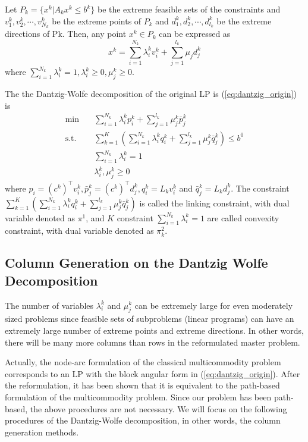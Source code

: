 Let $P_k=\{x^k|A_k x^k\leq b^k\}$ be the extreme feasible sets of the constraints and $v_1^k,v_2^k,\cdots,v_{N_k}^k$ be the extreme points of $P_k$ and $d_1^k,d_2^k,\cdots,d_{l_k}^k$ be the extreme directions of Pk. Then, any point $x^k\in P_k$ can be expressed as
\begin{equation}
    x^k=\sum_{i=1}^{N_k} \lambda_i^k v_i^k+\sum_{j=1}^{l_k} \mu_j d_j^k
\end{equation}
where $\sum_{i=1}^{N_k} \lambda_i^k=1,\lambda_i^k\geq 0,\mu_j^k\geq 0$. 

The the Dantzig-Wolfe decomposition of the original LP is (\ref{eq:dantzig_origin}) is
\begin{equation}
\label{eq:dantzig_decomp}
\begin{split}
    \min &\quad \sum_{i=1}^{N_k} \lambda_i^k p_i^k +\sum_{j=1}^{l_k} \mu_j^k \bar{p}_j^k\\
    \text{s.t.}&\quad \sum_{k=1}^K (\sum_{i=1}^{N_k} \lambda_i^k q_i^k +\sum_{j=1}^{l_k} \mu_j^k \bar{q}_j^k)\leq b^0\\
    &\quad \sum_{i=1}^{N_k}\lambda_i^k = 1\\
    &\quad \lambda_i^k,\mu_j^k\geq 0
\end{split}
\end{equation}
where $p_i=(c^k)^\top v_i^k, \bar{p}_j^k=(c^k)^\top d_j^k, q_i^k=L_kv_i^k$ and $\bar{q}_j^k=L_k d_j^k$. The constraint $\sum_{k=1}^K (\sum_{i=1}^{N_k} \lambda_i^k q_i^k +\sum_{j=1}^{l_k} \mu_j^k \bar{q}_j^k)$ is called the linking constraint, with dual variable denoted as $\pi^1$, and $K$ constraint $\sum_{i=1}^{N_k}\lambda_i^k = 1$ are called convexity constraint, with dual variable denoted as $\pi^2_k$.

\subsection{Column Generation on the Dantzig Wolfe Decomposition}

The number of variables $\lambda_i^k$ and $\mu_j^k$ can be extremely large for even moderately sized problems since feasible sets of subproblems (linear programs) can have an extremely large number of extreme points and extreme directions. In other words, there will be many more columns than rows in the reformulated master problem. 

Actually, the node-arc formulation of the classical multicommodity problem corresponds to an LP with the block angular form in (\ref{eq:dantzig_origin}). After the reformulation, it has been shown that it is equivalent to the path-based formulation of the multicommodity problem. Since our problem has been path-based, the above procedures are not necessary. We will focus on the following procedures of the Dantzig-Wolfe decomposition, in other words, the column generation methods. 

